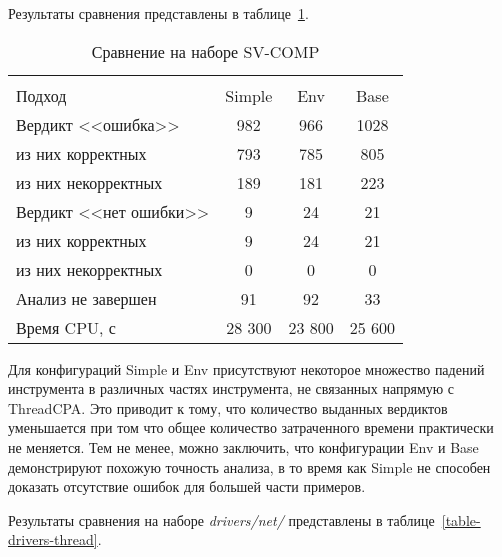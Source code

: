 Результаты сравнения представлены в таблице~\ref{table-svcomp-thread}.

  \begin{table}[h]\footnotesize \centering
    \caption{Сравнение на наборе SV-COMP}
  	\label{table-svcomp-thread}
    \begin{tabular}{ | l | c | c | c | }
      \hline
      		& 		\multicolumn{3}{c|}{\theory}  \\
      Подход         				& Simple   	& Env 		& Base  	\\ \hline
      Вердикт <<ошибка>> 				& 982    	& 966       & 1028       \\ 
  \hspace{0.5cm} из них корректных 	& 793 		& 785 		& 805    	\\ 
  \hspace{0.5cm} из них некорректных & 189 		& 181 		& 223     	\\ \hline
      Вердикт <<нет ошибки>>  		& 9      	& 24        & 21       	\\ 
  \hspace{0.5cm} из них корректных 	& 9 		& 24    	& 21      	\\
  \hspace{0.5cm} из них некорректных & 0 		& 0    		& 0     	\\ \hline
      Анализ не завершен       		& 91     	& 92        & 33    	\\ \hline
      Время CPU, с   				& 28 300 	& 23 800    & 25 600  	\\
      \hline
    \end{tabular}
  \end{table}

Для конфигураций Simple и Env присутствуют некоторое множество падений инструмента в различных частях инструмента, не связанных напрямую с ThreadCPA.
Это приводит к тому, что количество выданных вердиктов уменьшается при том что общее количество затраченного времени практически не меняется.
Тем не менее, можно заключить, что конфигурации Env и Base демонстрируют похожую точность анализа, в то время как Simple не способен доказать отсутствие ошибок для большей части примеров.

Результаты сравнения на наборе \textit{drivers/net/} представлены в таблице~\ref{table-drivers-thread}.

